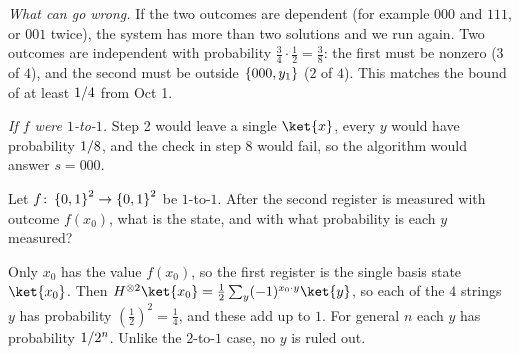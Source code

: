 \begin{exercisebox}
\begin{wsolution}
    \emph{What can go wrong.} If the two outcomes are dependent (for example $000$ and $111$, or
    $001$ twice), the system has more than two solutions and we run again. Two outcomes are
    independent with probability $\frac{3}{4} \cdot \frac{1}{2} = \frac{3}{8}$: the first must be
    nonzero ($3$ of $4$), and the second must be outside $\left\lbrace000, y_1\right\rbrace$ ($2$ of $4$). This matches
    the bound of at least $1/4$ from Oct 1.

    \emph{If $f$ were $1$-to-$1$.} Step 2 would leave a single $\ket{x}$, every $y$ would have
    probability $1/8$, and the check in step 8 would fail, so the algorithm would answer
    $s = 000$.
\end{wsolution}
\end{exercisebox}


\begin{exercisebox}
\begin{pproblem}[Simon's circuit for a $1$-to-$1$ $f$, $n = 2$]\label{wp:simon11}
    Let $f \colon \left\lbrace0,1\right\rbrace^2 \to \left\lbrace0,1\right\rbrace^2$ be $1$-to-$1$. After the second register is measured
    with outcome $f(x_0)$, what is the state, and with what probability is each $y$ measured?
\end{pproblem}
\tcblower
\begin{wsolution}
    Only $x_0$ has the value $f(x_0)$, so the first register is the single basis state
    $\ket{x_0}$. Then
    $H^{\otimes 2}\ket{x_0} = \frac{1}{2} \sum_y (-1)^{x_0 \cdot y} \ket{y}$, so each of the $4$
    strings $y$ has probability $\left(\frac{1}{2}\right)^2 = \frac{1}{4}$, and these add up to
    $1$. For general $n$ each $y$ has probability $1/2^n$. Unlike the $2$-to-$1$ case, no
    $y$ is ruled out.
\end{wsolution}
\end{exercisebox}

